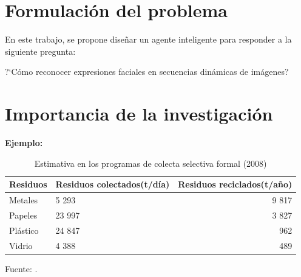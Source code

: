 \section{Formulación del problema}

  En este trabajo, se propone diseñar un agente inteligente para responder a la siguiente pregunta:
 \begin{center} 
     ?`Cómo reconocer expresiones faciales en secuencias dinámicas de imágenes?
 \end{center}

\section{Importancia de la investigación} 

{\bf Ejemplo:}\par

\begin{center}
\begin{table}[ht!]
\centering
\caption{Estimativa en los programas de colecta selectiva formal (2008)}
\begin{tabular}{llr} \toprule
Residuos & Residuos colectados(t/día) & Residuos reciclados(t/año) \\ \midrule
Metales & 5 293 & 9 817 \\
Papeles & 23 997 & 3 827 \\
Plástico & 24 847 & 962 \\
Vidrio & 4 388 & 489 \\ \bottomrule
\end{tabular}
\vskip 0.2cm
\begin{center}
{\small{Fuente: \cite{MMA}.}}
\end{center}
\end{table}
\end{center}
\vskip 0.5cm



